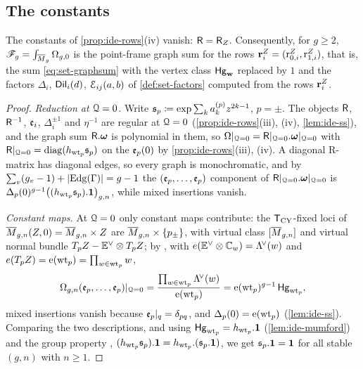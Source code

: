 \subsection{The constants}

\begin{prop}[$\Rm=\RZ$]
\label{prop:ide-const}
The constants of \cref{prop:ide-rows}(iv) vanish: $\Rm=\RZ$. Consequently, for $g\geq 2$, $\mathscr{F}_g=\int_{\overline{M}_g}\Omega_{g,0}$ is the point-frame graph sum for the rows $\mathbf{r}^Z_i=(\mathrm{r}^{Z}_{0,i},\mathrm{r}^{Z}_{1,i})$, that is, the sum \cref{eq:set-graphsum} with the vertex class $\mathsf{Hg}_{\mathbf{w}}$ replaced by $1$ and the factors $\Delta_i$, $\mathsf{Dil}_i(d)$, $\mathcal{E}_{ij}(a,b)$ of \cref{def:set-factors} computed from the rows $\mathbf{r}^Z_i$.
\end{prop}
\begin{proof}
\emph{Reduction at $\mathcal{Q}=0$.} Write $\mathfrak{s}_p\coloneqq\exp\sum_ka_k^{(p)}z^{2k-1}$, $p=\pm$. The objects $\mathsf{R}$, $\mathsf{R}^{-1}$, $\mathfrak{e}_i$, $\Delta_i^{\pm1}$ and $\eta^{-1}$ are regular at $\mathcal{Q}=0$ (\cref{prop:ide-rows}(iii), (iv), \cref{lem:ide-ss}), and the graph sum $\mathsf{R}.\boldsymbol{\omega}$ is polynomial in them, so $\Omega|_{\mathcal{Q}=0}=\mathsf{R}|_{\mathcal{Q}=0}.\boldsymbol{\omega}|_{\mathcal{Q}=0}$ with $\mathsf{R}|_{\mathcal{Q}=0}=\mathrm{diag}(h_{\mathrm{wt}_p}\mathfrak{s}_p)$ on the $\mathfrak{e}_p(0)$ by \cref{prop:ide-rows}(iii), (iv). A diagonal R-matrix has diagonal edges, so every graph is monochromatic, and by $\sum_v(g_v-1)+|\mathrm{Edg}(\Gamma)|=g-1$ the $(\mathfrak{e}_p,\dots,\mathfrak{e}_p)$ component of $\mathsf{R}|_{\mathcal{Q}=0}.\boldsymbol{\omega}|_{\mathcal{Q}=0}$ is $\Delta_p(0)^{g-1}\big((h_{\mathrm{wt}_p}\mathfrak{s}_p).\mathbf{1}\big)_{g,n}$, while mixed insertions vanish.

\emph{Constant maps.} At $\mathcal{Q}=0$ only constant maps contribute: the $\mathsf{T}_{\mathrm{CY}}$-fixed loci of $\overline{M}_{g,n}(Z,0)=\overline{M}_{g,n}\times Z$ are $\overline{M}_{g,n}\times\{p_\pm\}$, with virtual class $[\overline{M}_{g,n}]$ and virtual normal bundle $T_pZ-\mathbb{E}^\vee\otimes T_pZ$; by \cite{GP99}, with $e(\mathbb{E}^\vee\otimes\mathbb{C}_w)=\Lambda^{\!\vee}(w)$ and $e(T_pZ)=\mathrm{e}(\mathrm{wt}_p)=\prod_{w\in\mathrm{wt}_p}w$,
\[
\Omega_{g,n}(\mathfrak{e}_p,\dots,\mathfrak{e}_p)|_{\mathcal{Q}=0}=\frac{\prod_{w\in\mathrm{wt}_p}\Lambda^{\!\vee}(w)}{\mathrm{e}(\mathrm{wt}_p)}=\mathrm{e}(\mathrm{wt}_p)^{g-1}\,\mathsf{Hg}_{\mathrm{wt}_p},
\]
mixed insertions vanish because $\mathfrak{e}_p|_{q}=\delta_{pq}$, and $\Delta_p(0)=\mathrm{e}(\mathrm{wt}_p)$ (\cref{lem:ide-ss}). Comparing the two descriptions, and using $\mathsf{Hg}_{\mathrm{wt}_p}=h_{\mathrm{wt}_p}.\mathbf{1}$ (\cref{lem:ide-mumford}) and the group property \cite[Prop.~2.14]{PPZ15}, $(h_{\mathrm{wt}_p}\mathfrak{s}_p).\mathbf{1}=h_{\mathrm{wt}_p}.(\mathfrak{s}_p.\mathbf{1})$, we get $\mathfrak{s}_p.\mathbf{1}=\mathbf{1}$ for all stable $(g,n)$ with $n\geq 1$.


\end{proof}
